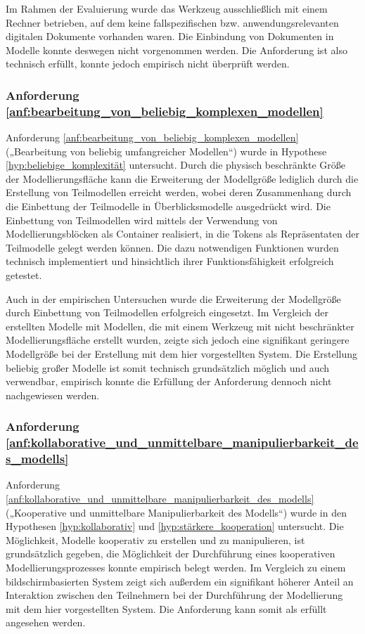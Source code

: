 Im Rahmen der Evaluierung wurde das Werkzeug ausschließlich mit einem Rechner betrieben, auf dem keine fallspezifischen bzw. anwendungsrelevanten digitalen Dokumente vorhanden waren. Die Einbindung von Dokumenten in Modelle konnte deswegen nicht vorgenommen werden. Die Anforderung ist also technisch erfüllt, konnte jedoch empirisch nicht überprüft werden. 

\subsubsection{Anforderung \ref{anf:bearbeitung_von_beliebig_komplexen_modellen}}
Anforderung \ref{anf:bearbeitung_von_beliebig_komplexen_modellen} („Bearbeitung von beliebig umfangreicher Modellen“) wurde in Hypothese \ref{hyp:beliebige_komplexität} untersucht. Durch die physisch beschränkte Größe der Modellierungsfläche kann die Erweiterung der Modellgröße lediglich durch die Erstellung von Teilmodellen erreicht werden, wobei deren Zusammenhang durch die Einbettung der Teilmodelle in Überblicksmodelle ausgedrückt wird. Die Einbettung von Teilmodellen wird mittels der Verwendung von Modellierungsblöcken als Container realisiert, in die Tokens als Repräsentaten der Teilmodelle gelegt werden können. Die dazu notwendigen Funktionen wurden technisch implementiert und hinsichtlich ihrer Funktionsfähigkeit erfolgreich getestet. 

Auch in der empirischen Untersuchen wurde die Erweiterung der Modellgröße durch Einbettung von Teilmodellen erfolgreich eingesetzt. Im Vergleich der erstellten Modelle mit Modellen, die mit einem Werkzeug mit nicht beschränkter Modellierungsfläche erstellt wurden, zeigte sich jedoch eine signifikant geringere Modellgröße bei der Erstellung mit dem hier vorgestellten System. Die Erstellung beliebig großer Modelle ist somit technisch grundsätzlich möglich und auch verwendbar, empirisch konnte die Erfüllung der Anforderung dennoch nicht nachgewiesen werden.

\subsubsection{Anforderung \ref{anf:kollaborative_und_unmittelbare_manipulierbarkeit_des_modells}}
Anforderung \ref{anf:kollaborative_und_unmittelbare_manipulierbarkeit_des_modells} („Kooperative und unmittelbare Manipulierbarkeit des Modells“) wurde in den Hypothesen \ref{hyp:kollaborativ} und \ref{hyp:stärkere_kooperation} untersucht. Die Möglichkeit, Modelle kooperativ zu erstellen und zu manipulieren, ist grundsätzlich gegeben, die Möglichkeit der Durchführung eines kooperativen Modellierungsprozesses konnte empirisch belegt werden. Im Vergleich zu einem bildschirmbasierten System zeigt sich außerdem ein signifikant höherer Anteil an Interaktion zwischen den Teilnehmern bei der Durchführung der Modellierung mit dem hier vorgestellten System. Die Anforderung kann somit als erfüllt angesehen werden.

